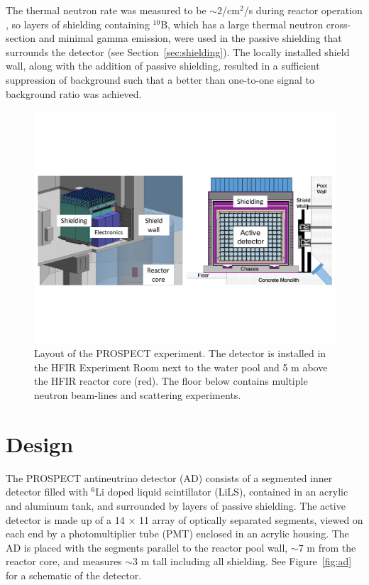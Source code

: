 The thermal neutron rate was measured to be $\sim$2/cm$^2$/s during reactor operation \cite{Ashenfelter:2015tpm}, so layers of shielding containing $^{10}$B, which has a large thermal neutron cross-section and minimal gamma emission, were used in the passive shielding that surrounds the detector (see Section~\ref{sec:shielding}). 
The locally installed shield wall, along with the addition of passive shielding, resulted in a sufficient suppression of background such that a better than one-to-one signal to background ratio was achieved. 

\begin{figure}[t]
	\centering
	\includegraphics[width=0.5\linewidth]{tex/4-prospect-images/Shielding}
	\caption[Layout of PROSPECT at HFIR]{Layout of the PROSPECT experiment. The detector is installed in the HFIR Experiment Room next to the water pool and 5 m above the HFIR reactor core (red). The floor below contains multiple neutron beam-lines and scattering experiments.}
	\label{fig:shielding}
\end{figure}

\section{Design}

The PROSPECT antineutrino detector (AD) consists of a segmented inner detector filled with $^6$Li doped liquid scintillator (LiLS), contained in an acrylic and aluminum tank, and surrounded by layers of passive shielding. 
The active detector is made up of a 14  $\times$ 11 array of optically separated segments, viewed on each end by a photomultiplier tube (PMT) enclosed in an acrylic housing. 
The AD is placed with the segments parallel to the reactor pool wall, $\sim$7 m from the reactor core, and measures $\sim$3 m tall including all shielding. 
See Figure~\ref{fig:ad} for a schematic of the detector. 

